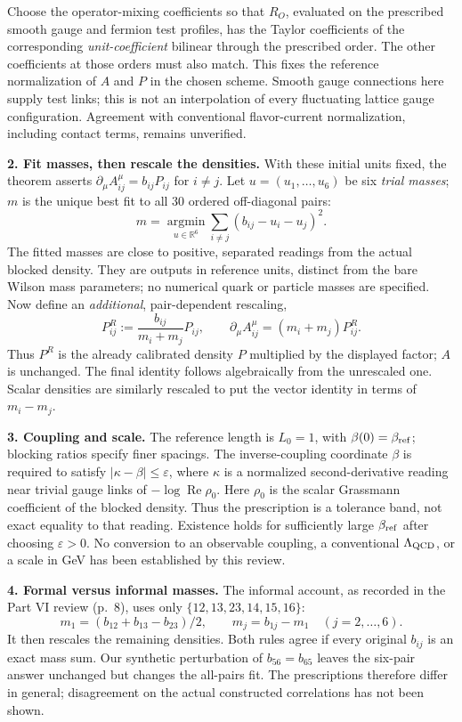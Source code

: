 \documentclass[11pt]{article}
\begin{document}
Choose the operator-mixing coefficients so that $R_O$, evaluated on the
prescribed smooth gauge and fermion test profiles, has the Taylor
coefficients of the corresponding \emph{unit-coefficient} bilinear through
the prescribed order. The other coefficients at those orders must also
match. This fixes the reference normalization of $A$ and $P$ in the chosen
scheme. Smooth gauge connections here supply test links; this is not an
interpolation of every fluctuating lattice gauge configuration.
Agreement with conventional flavor-current normalization, including
contact terms, remains unverified.

\textbf{2. Fit masses, then rescale the densities.}
With these initial units fixed, the theorem asserts
$\partial_\mu A^\mu_{ij}=b_{ij}P_{ij}$ for $i\ne j$. Let
$u=(u_1,\ldots,u_6)$ be six \emph{trial masses}; $m$ is the unique best fit
to all 30 ordered off-diagonal pairs:
\[
 m=\underset{u\in\mathbb R^6}{\operatorname{argmin}}
       \sum_{i\ne j}(b_{ij}-u_i-u_j)^2.
\]
The fitted masses are close to positive, separated readings from the
actual blocked density. They are outputs in reference units, distinct from
the bare Wilson mass parameters; no numerical quark or particle masses are
specified. Now define an \emph{additional}, pair-dependent rescaling,
\[
 P^R_{ij}:=\frac{b_{ij}}{m_i+m_j}P_{ij},
 \qquad
 \partial_\mu A^\mu_{ij}=(m_i+m_j)P^R_{ij}.
\]
Thus $P^R$ is the already calibrated density $P$ multiplied by the displayed
factor; $A$ is unchanged. The final identity follows algebraically from the
unrescaled one. Scalar densities are similarly rescaled to put the vector
identity in terms of $m_i-m_j$.

\textbf{3. Coupling and scale.}
The reference length is $L_0=1$, with $\beta(0)=\beta_{\rm ref}$;
blocking ratios specify finer spacings. The inverse-coupling coordinate
$\beta$ is required to satisfy $|\kappa-\beta|\leq\varepsilon$, where
$\kappa$ is a normalized second-derivative reading near trivial gauge links
of $-\log\operatorname{Re}\rho_0$. Here $\rho_0$ is the scalar Grassmann
coefficient of the blocked density. Thus the prescription is a tolerance
band, not exact equality to that reading. Existence holds for sufficiently
large $\beta_{\rm ref}$ after choosing $\varepsilon>0$. No conversion to an
observable coupling, a conventional $\Lambda_{\rm QCD}$, or a scale in GeV
has been established by this review.

\textbf{4. Formal versus informal masses.}
The informal account, as recorded in the Part VI review (p.~8), uses only
$\{12,13,23,14,15,16\}$:
\[
 m_1=(b_{12}+b_{13}-b_{23})/2,
 \qquad m_j=b_{1j}-m_1\quad(j=2,\ldots,6).
\]
It then rescales the remaining densities. Both rules agree if every original
$b_{ij}$ is an exact mass sum. Our synthetic perturbation of $b_{56}=b_{65}$
leaves the six-pair answer unchanged but changes the all-pairs fit.
The prescriptions therefore differ in general; disagreement on the actual
constructed correlations has not been shown.
\end{document}
